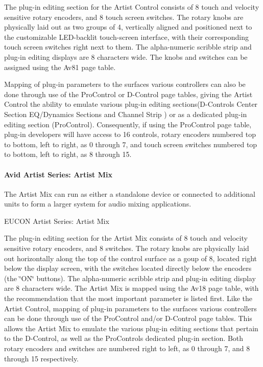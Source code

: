 The plug-\/in editing section for the Artist Control consists of 8 touch and velocity sensitive rotary encoders, and 8 touch screen switches. The rotary knobs are physically laid out as two groups of 4, vertically aligned and positioned next to the customizable L\+E\+D-\/backlit touch-\/screen interface, with their corresponding touch screen switches right next to them. The alpha-\/numeric scribble strip and plug-\/in editing displays are 8 characters wide. The knobs and switches can be assigned using the {\ttfamily Av81} page table.

Mapping of plug-\/in parameters to the surface\textquotesingle{}s various controllers can also be done through use of the Pro\+Control or D-\/\+Control page tables, giving the Artist Control the ability to emulate various plug-\/in editing sections(D-\/\+Control\textquotesingle{}s Center Section E\+Q/\+Dynamics Sections and Channel Strip ) or as a dedicated plug-\/in editing section (Pro\+Control). Consequently, if using the Pro\+Control page table, plug-\/in developers will have access to 16 controls, rotary encoders numbered top to bottom, left to right, as 0 through 7, and touch screen switches numbered top to bottom, left to right, as 8 through 15.

\hypertarget{a00833_subsubsection__avid_artist_series_mc_mix_}{}\paragraph{Avid Artist Series\+: Artist Mix}\label{a00833_subsubsection__avid_artist_series_mc_mix_}
 The Artist Mix can run as either a standalone device or connected to additional units to form a larger system for audio mixing applications.

  E\+U\+C\+ON Artist Series\+: Artist Mix

The plug-\/in editing section for the Artist Mix consists of 8 touch and velocity sensitive rotary encoders, and 8 switches. The rotary knobs are physically laid out horizontally along the top of the control surface as a goup of 8, located right below the display screen, with the switches located directly below the encoders (the \char`\"{}\+O\+N\char`\"{} buttons). The alpha-\/numeric scribble strip and plug-\/in editing display are 8 characters wide. The Artist Mix is mapped using the {\ttfamily Av18} page table, with the recommendation that the most important parameter is listed first. Like the Artist Control, mapping of plug-\/in parameters to the surface\textquotesingle{}s various controllers can be done through use of the Pro\+Control and/or D-\/\+Control page tables. This allows the Artist Mix to emulate the various plug-\/in editing sections that pertain to the D-\/\+Control, as well as the Pro\+Control\textquotesingle{}s dedicated plug-\/in section. Both rotary encoders and switches are numbered right to left, as 0 through 7, and 8 through 15 respectively.


